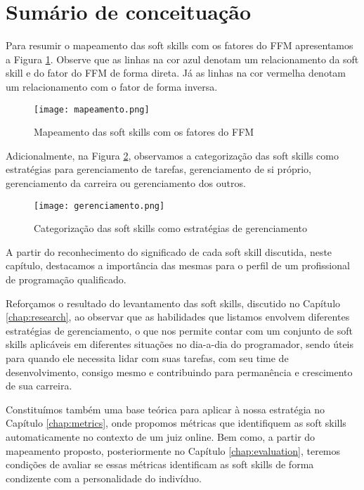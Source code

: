 \section{Sumário de conceituação}

Para resumir o mapeamento das soft skills com os fatores do FFM apresentamos a Figura \ref{fig:mapeamento}. Observe que as linhas na cor azul denotam um relacionamento da soft skill e do fator do FFM de forma direta. Já as linhas na cor vermelha denotam um relacionamento com o fator de forma inversa.

\begin{figure}[ht]
\centering
\caption{\small Mapeamento das soft skills com os fatores do FFM} 
\texttt{[image: mapeamento.png]}
\label{fig:mapeamento}
\end{figure}

Adicionalmente, na Figura \ref{fig:gerenciamento}, observamos a categorização das soft skills como estratégias para gerenciamento de tarefas, gerenciamento de si próprio, gerenciamento da carreira ou gerenciamento dos outros.

\begin{figure}[ht]
\centering
\caption{\small Categorização das soft skills como estratégias de gerenciamento} %
\texttt{[image: gerenciamento.png]}
\label{fig:gerenciamento}
\end{figure}

A partir do reconhecimento do significado de cada soft skill discutida, neste capítulo, destacamos a importância das mesmas para o perfil de um profissional de programação qualificado.

Reforçamos o resultado do levantamento das soft skills, discutido no Capítulo \ref{chap:research}, ao observar que as habilidades que listamos envolvem diferentes estratégias de gerenciamento, o que nos permite contar com um conjunto de soft skills aplicáveis em diferentes situações no dia-a-dia do programador, sendo úteis para quando ele necessita lidar com suas tarefas, com seu time de desenvolvimento, consigo mesmo e contribuindo para permanência e crescimento de sua carreira.

Constituímos também uma base teórica para aplicar à nossa estratégia no Capítulo \ref{chap:metrics}, onde propomos métricas que identifiquem as soft skills automaticamente no contexto de um juiz online. Bem como, a partir do mapeamento proposto, posteriormente no Capítulo  \ref{chap:evaluation}, teremos condições de avaliar se essas métricas identificam as soft skills de forma condizente com a personalidade do indivíduo.